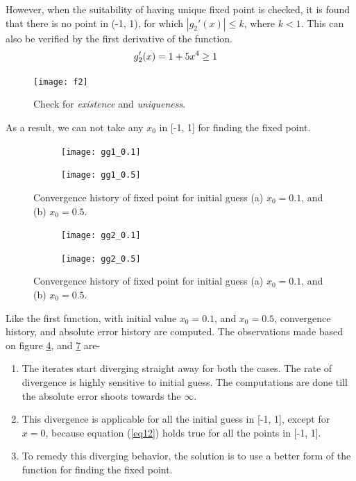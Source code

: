 \documentclass[11pt]{article} %
\begin{document}
However, when the suitability of having unique fixed point is checked, it is found that there is no point in (-1, 1), for which $\left|g_2'(x)\right| \leq k$, where $k < 1$. This can also be verified by the first derivative of the function. 
\begin{equation}
\begin{split}
\centering
&g_2'(x) = 1 + 5x^4 \geq 1
\label{eq12}
\end{split}
\end{equation}
 \begin{figure}[!htb]
    \centering
        \texttt{[image: f2]}
    \caption{Check for \textit{existence} and \textit{uniqueness}.}
    \label{fig8}
\end{figure}
As a result, we can not take any $x_0$ in [-1, 1] for finding the fixed point.
\begin{figure}[!htb]
    \centering
    \begin{subfigure}{.5\textwidth}
        \centering
        \texttt{[image: gg1\_0.1]}
        \caption{}
        \label{fig9a}
    \end{subfigure}\hfill
    \begin{subfigure}{0.5\textwidth}
        \centering
        \texttt{[image: gg1\_0.5]}
        \caption{}
        \label{fig9b}
    \end{subfigure}
    \caption{Convergence history of fixed point for initial guess (a) $x_0 = 0.1$, and (b) $x_0 = 0.5$.}
    \label{fig9}
\end{figure}
\begin{figure}[!htb]
    \centering
    \begin{subfigure}{.5\textwidth}
        \centering
        \texttt{[image: gg2\_0.1]}
        \caption{}
        \label{fig10a}
    \end{subfigure}\hfill
    \begin{subfigure}{0.5\textwidth}
        \centering
        \texttt{[image: gg2\_0.5]}
        \caption{}
        \label{fig10b}
    \end{subfigure}
    \caption{Convergence history of fixed point for initial guess (a) $x_0 = 0.1$, and (b) $x_0 = 0.5$.}
    \label{fig10}
\end{figure}

Like the first function, with initial value $x_0 = 0.1$, and $x_0 = 0.5$, convergence history, and absolute error history are computed. The observations made based on figure \ref{fig9}, and \ref{fig10} are-
\begin{enumerate}
\item The iterates start diverging straight away for both the cases. The rate of divergence is highly sensitive to initial guess. The computations are done till the absolute error shoots towards the $\infty$.
\item This divergence is applicable for all the initial guess in [-1, 1], except for $x = 0$, because equation (\ref{eq12}) holds true for all the points in [-1, 1].
\item To remedy this diverging behavior, the solution is to use a better form of the function for finding the fixed point.
\end{enumerate}
\end{document}
